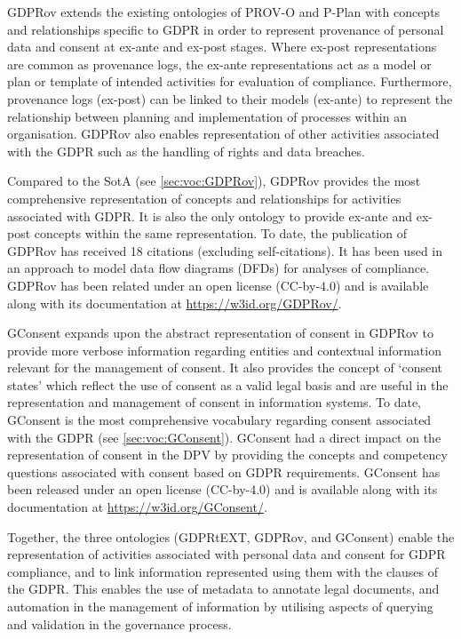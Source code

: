 GDPRov extends the existing ontologies of PROV-O and P-Plan with concepts and relationships specific to GDPR in order to represent provenance of personal data and consent at ex-ante and ex-post stages. Where ex-post representations are common as provenance logs, the ex-ante representations act as a model or plan or template of intended activities for evaluation of compliance. Furthermore, provenance logs (ex-post) can be linked to their models (ex-ante) to represent the relationship between planning and implementation of processes within an organisation. GDPRov also enables representation of other activities associated with the GDPR such as the handling of rights and data breaches.

Compared to the SotA (see \autoref{sec:voc:GDPRov}), GDPRov provides the most comprehensive representation of concepts and relationships for activities associated with GDPR.
It is also the only ontology to provide ex-ante and ex-post concepts within the same representation.
To date, the publication of GDPRov has received 18 citations (excluding self-citations). It has been used in an approach to model data flow diagrams (DFDs) for analyses of compliance.
GDPRov has been related under an open license (CC-by-4.0) and is available along with its documentation at \url{https://w3id.org/GDPRov/}.

GConsent expands upon the abstract representation of consent in GDPRov to provide more verbose information regarding entities and contextual information relevant for the management of consent. It also provides the concept of `consent states' which reflect the use of consent as a valid legal basis and are useful in the  representation and management of consent in information systems. To date, GConsent is the most comprehensive vocabulary regarding consent associated with the GDPR (see \autoref{sec:voc:GConsent}).
GConsent had a direct impact on the representation of consent in the DPV by providing the concepts and competency questions associated with consent based on GDPR requirements.
GConsent has been released under an open license (CC-by-4.0) and is available along with its documentation at \url{https://w3id.org/GConsent/}.

Together, the three ontologies (GDPRtEXT, GDPRov, and GConsent) enable the representation of activities associated with personal data and consent for GDPR compliance, and to link information represented using them with the clauses of the GDPR.
This enables the use of metadata to annotate legal documents, and automation in the management of information by utilising aspects of querying and validation in the governance process.

